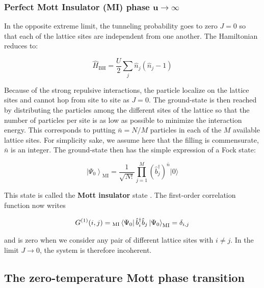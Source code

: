 \subsubsection{Perfect Mott Insulator (MI) phase $\bm{u \to \infty}$}

In the opposite extreme limit, the tunneling probability goes to zero $J=0$ so that each of the lattice sites are independent from one another. The Hamiltonian reduces to:

\begin{equation}
    \hat{H}_{\mathrm{BH}} = \frac{U}{2} \sum_j \hat{n}_j (\hat{n}_j -1)
\end{equation}

Because of the strong repulsive interactions, the particle localize on the lattice sites and cannot hop from site to site as $J=0$. The ground-state is then reached by distributing the particles among the different sites of the lattice so that the number of particles per site is as low as possible to minimize the interaction energy. This corresponds to putting $\bar{n}=N/M$ particles in each of the $M$ available lattice sites. For simplicity sake, we assume here that the filling is commensurate, \ie $\bar{n}$ is an integer. The ground-state then has the simple expression of a Fock state:

\begin{equation}
    \left|\Psi_{0}\right\rangle_{\mathrm{MI}}=\frac{1}{\sqrt{N !}} \prod_{j=1}^{M}\left(\hat{b}_{j}^{\dagger}\right)^{\bar{n}}|0\rangle
    \label{eq:ground-state_MI}
\end{equation}

\noindent This state is called the \textbf{Mott insulator} state \cite{fisher1989boson}. The first-order correlation function now writes

\begin{equation}
     G^{(1)}(i,j)= {}_{\mathrm{MI}} \bra{\Psi_0} \hat{b}^{\dagger}_i \hat{b}_j \ket{\Psi_0}_{\mathrm{MI}} = \delta_{i,j}
\end{equation}

\noindent and is zero when we consider any pair of different lattice sites with $i \neq j$. In the limit $J \to 0$, the system is therefore incoherent.



\subsection{The zero-temperature Mott phase transition}

